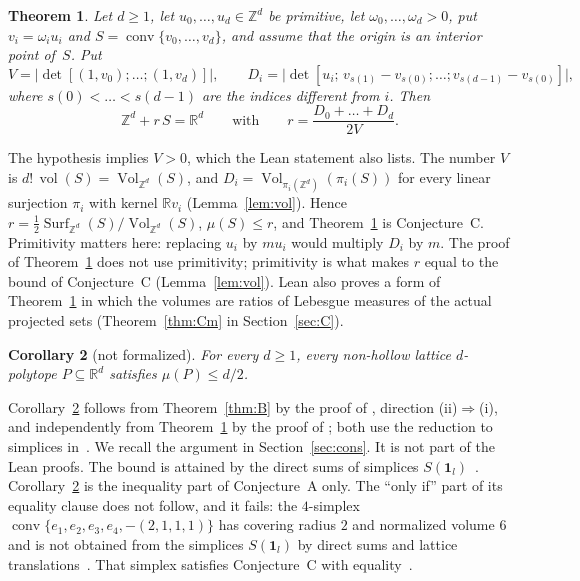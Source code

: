 \documentclass[11pt]{article}
\newtheorem{theorem}{Theorem}
\newtheorem{corollary}[theorem]{Corollary}
\theoremstyle{definition}
\theoremstyle{remark}
\newcommand{\R}{\mathbb R}
\newcommand{\Z}{\mathbb Z}
\newcommand{\one}{\mathbf 1}
\newcommand{\conv}{\operatorname{conv}}
\newcommand{\Vol}{\operatorname{Vol}}
\newcommand{\vol}{\operatorname{vol}}
\newcommand{\Surf}{\operatorname{Surf}}
\begin{document}
\begin{theorem}\label{thm:C}
Let $d\ge1$, let $u_0,\dots,u_d\in\Z^d$ be primitive, let
$\omega_0,\dots,\omega_d>0$, put $v_i=\omega_iu_i$ and
$S=\conv\{v_0,\dots,v_d\}$, and assume that the origin is an interior point
of~$S$. Put
\[
V=\bigl|\det[(1,v_0);\dots;(1,v_d)]\bigr|,\qquad
D_i=\bigl|\det[u_i;\,v_{s(1)}-v_{s(0)};\dots;v_{s(d-1)}-v_{s(0)}]\bigr|,
\]
where $s(0)<\dots<s(d-1)$ are the indices different from $i$. Then
\[
\Z^d+r\,S=\R^d\qquad\text{with}\qquad r=\frac{D_0+\dots+D_d}{2V}.
\]
\end{theorem}

\noindent The hypothesis implies $V>0$, which the Lean statement also lists.
The number $V$ is $d!\,\vol(S)=\Vol_{\Z^d}(S)$, and
$D_i=\Vol_{\pi_i(\Z^d)}(\pi_i(S))$ for every linear surjection $\pi_i$ with
kernel $\R v_i$ (Lemma~\ref{lem:vol}). Hence $r=\frac12\Surf_{\Z^d}(S)/\Vol_{\Z^d}(S)$,
$\mu(S)\le r$, and Theorem~\ref{thm:C} is Conjecture~C. Primitivity matters
here: replacing $u_i$ by $mu_i$ would multiply $D_i$ by $m$. The proof of
Theorem~\ref{thm:C} does not use primitivity; primitivity is what makes $r$
equal to the bound of Conjecture~C (Lemma~\ref{lem:vol}). Lean also proves
a form of Theorem~\ref{thm:C} in which the volumes are ratios of Lebesgue
measures of the actual projected sets (Theorem~\ref{thm:Cm} in
Section~\ref{sec:C}).

\begin{corollary}[not formalized]\label{cor:A}
For every $d\ge1$, every non-hollow lattice $d$-polytope $P\subseteq\R^d$
satisfies $\mu(P)\le d/2$.
\end{corollary}

\noindent Corollary~\ref{cor:A} follows from Theorem~\ref{thm:B} by the proof
of \cite[Theorem~1.2]{css}, direction (ii)$\Rightarrow$(i), and independently
from Theorem~\ref{thm:C} by the proof of \cite[Corollary~4.3]{css}; both use
the reduction to simplices in~\cite[Corollary~3.2]{css}. We recall the argument
in Section~\ref{sec:cons}. It is not part of the Lean proofs. The bound is
attained by the direct sums of simplices $S(\one_l)$~\cite[eq.~(1) and
Corollary~2.2]{css}. Corollary~\ref{cor:A} is the inequality part of
Conjecture~A only. The ``only if'' part of its equality clause does not
follow, and it fails: the $4$-simplex $\conv\{e_1,e_2,e_3,e_4,-(2,1,1,1)\}$
has covering radius $2$ and normalized volume $6$ and is not obtained from
the simplices $S(\one_l)$ by direct sums and lattice translations~\cite{p21}.
That simplex satisfies Conjecture~C with equality~\cite[Remark~3]{p21}.
\end{document}
